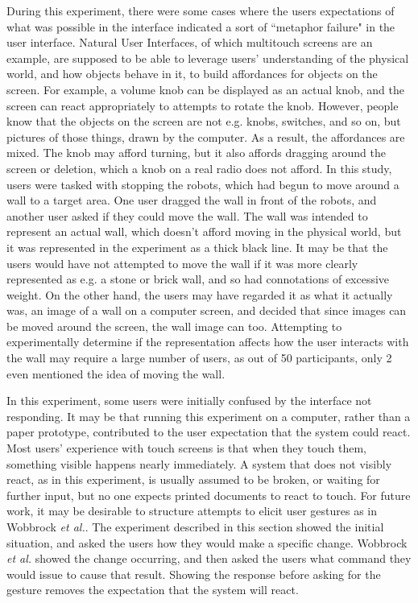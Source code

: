During this experiment, there were some cases where the users expectations of what was possible in the interface indicated a sort of ``metaphor failure" in the user interface. 
Natural User Interfaces, of which multitouch screens are an example, are supposed to be able to leverage users' understanding of the physical world, and how objects behave in it, to build affordances for objects on the screen. 
For example, a volume knob can be displayed as an actual knob, and the screen can react appropriately to attempts to rotate the knob. 
However, people know that the objects on the screen are not e.g. knobs, switches, and so on, but pictures of those things, drawn by the computer. 
As a result, the affordances are mixed. 
The knob may afford turning, but it also affords dragging around the screen or deletion, which a knob on a real radio does not afford. 
In this study, users were tasked with stopping the robots, which had begun to move around a wall to a target area. 
One user dragged the wall in front of the robots, and another user asked if they could move the wall. 
The wall was intended to represent an actual wall, which doesn't afford moving in the physical world, but it was represented in the experiment as a thick black line. 
It may be that the users would have not attempted to move the wall if it was more clearly represented as e.g. a stone or brick wall, and so had connotations of excessive weight. 
On the other hand, the users may have regarded it as what it actually was, an image of a wall on a computer screen, and decided that since images can be moved around the screen, the wall image can too. 
Attempting to experimentally determine if the representation affects how the user interacts with the wall may require a large number of users, as out of 50 participants, only 2 even mentioned the idea of moving the wall. 

In this experiment, some users were initially confused by the interface not responding. 
It may be that running this experiment on a computer, rather than a paper prototype, contributed to the user expectation that the system could react. 
Most users' experience with touch screens is that when they touch them, something visible happens nearly immediately. 
A system that does not visibly react, as in this experiment, is usually assumed to be broken, or waiting for further input, but no one expects printed documents to react to touch.
For future work, it may be desirable to structure attempts to elicit user gestures as in Wobbrock \emph{et al.}. 
The experiment described in this section showed the initial situation, and asked the users how they would make a specific change. 
Wobbrock \emph{et al.} showed the change occurring, and then asked the users what command they would issue to cause that result. 
Showing the response before asking for the gesture removes the expectation that the system will react. 

